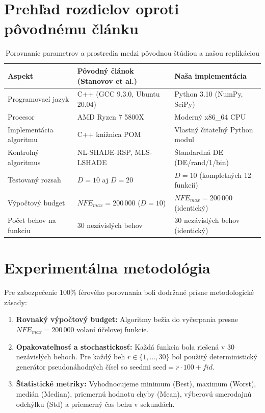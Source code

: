 \documentclass[11pt,a4paper]{article}
\begin{document}
\section{Prehľad rozdielov oproti pôvodnému článku}
\begin{table}[H]
\centering
\caption{Porovnanie parametrov a prostredia medzi pôvodnou štúdiou a našou replikáciou}
\label{tab:differences}
\begin{tabular}{lll}
\toprule
\textbf{Aspekt} & \textbf{Pôvodný článok (Stanovov et al.)} & \textbf{Naša implementácia} \\
\midrule
Programovací jazyk & C++ (GCC 9.3.0, Ubuntu 20.04) & Python 3.10 (NumPy, SciPy) \\
Procesor & AMD Ryzen 7 5800X & Moderný x86\_64 CPU \\
Implementácia algoritmu & C++ knižnica POM & Vlastný čitateľný Python modul \\
Kontrolný algoritmus & NL-SHADE-RSP, MLS-LSHADE & Štandardná DE (DE/rand/1/bin) \\
Testovaný rozsah & $D = 10$ aj $D = 20$ & $D = 10$ (kompletných 12 funkcií) \\
Výpočtový budget & $NFE_{max} = 200\,000$ ($D=10$) & $NFE_{max} = 200\,000$ (identický) \\
Počet behov na funkciu & 30 nezávislých behov & 30 nezávislých behov (identický) \\
\bottomrule
\end{tabular}
\end{table}

\section{Experimentálna metodológia}
Pre zabezpečenie 100\% férového porovnania boli dodržané prísne metodologické zásady:
\begin{enumerate}
    \item \textbf{Rovnaký výpočtový budget:} Algoritmy bežia do vyčerpania presne $NFE_{max} = 200\,000$ volaní účelovej funkcie.
    \item \textbf{Opakovateľnosť a stochastickosť:} Každá funkcia bola riešená v 30 nezávislých behoch. Pre každý beh $r \in \{1, \dots, 30\}$ bol použitý deterministický generátor pseudonáhodných čísel so seedmi $\text{seed} = r \cdot 100 + fid$.
    \item \textbf{Štatistické metriky:} Vyhodnocujeme minimum (Best), maximum (Worst), medián (Median), priemernú hodnotu chyby (Mean), výberovú smerodajnú odchýlku (Std) a priemerný čas behu v sekundách.
\end{enumerate}
\end{document}

